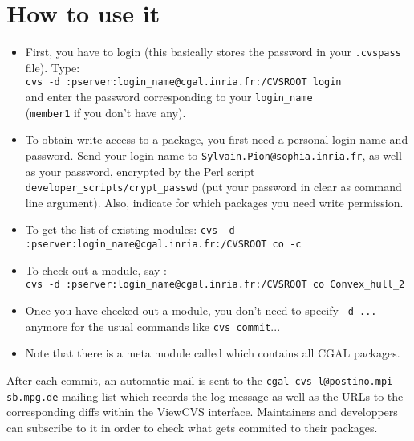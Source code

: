 \section{How to use it}
\label{sec:cvs_how_to}

\begin{itemize}
\item
    First, you have to login (this basically stores the password in your
    \texttt{.cvspass} file). Type: \\
    \texttt{cvs -d :pserver:login\_name@cgal.inria.fr:/CVSROOT login} \\
    and enter the password corresponding to your \texttt{login\_name} \\
    (\texttt{member1} if you don't have any).
\item
    To obtain write access to a package, you first need a personal login
    name and password.  Send your login name to 
    {\texttt{Sylvain.Pion@sophia.inria.fr}}, as well as your password,
    encrypted by the Perl script \texttt{developer\_scripts/crypt\_passwd}
    (put your password in clear as command line argument).
    Also, indicate for which packages you need write permission.
\item
    To get the list of existing modules:
    \texttt{cvs -d :pserver:login\_name@cgal.inria.fr:/CVSROOT co -c}
\item
    To check out a module, say : \\
    \texttt{cvs -d :pserver:login\_name@cgal.inria.fr:/CVSROOT co
    Convex\_hull\_2}
\item
    Once you have checked out a module, you don't need to specify
    \texttt{-d ...} anymore for the usual commands like \texttt{cvs commit}...
\item
    Note that there is a meta module called  which contains all CGAL
    packages.
\end{itemize}

After each commit, an automatic mail is sent to the
\texttt{cgal-cvs-l@postino.mpi-sb.mpg.de} mailing-list which records
the log message as well as the URLs to the corresponding diffs within
the ViewCVS interface.  Maintainers and developpers can subscribe
to it in order to check what gets commited to their packages.

